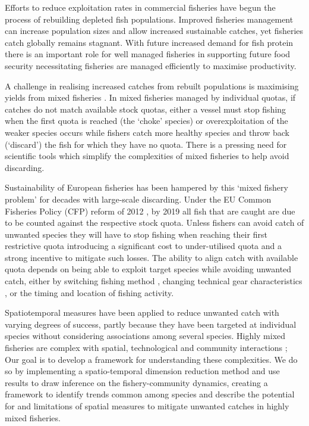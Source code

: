 \documentclass{nature}
\begin{document}
\begin{linenumbers}
 Efforts to reduce exploitation rates in commercial fisheries
have begun the process of rebuilding depleted fish populations\cite{Worm2009}.
Improved fisheries management  can increase
population sizes and allow increased sustainable catches, yet fisheries catch
globally remains stagnant\cite{FAO2016}. With future increased demand for fish
protein  there is an important role for well managed
fisheries in supporting future food security \cite{Mcclanahan2015}
  necessitating
	 fisheries are managed efficiently to
maximise productivity.

A  challenge in realising increased catches
from rebuilt populations is maximising yields from mixed fisheries
\cite{Branch2008, Kuriyama2016, Ulrich2016}. In mixed fisheries managed by individual quotas,
if catches do not match available stock quotas,
either a vessel must stop fishing when the first quota is reached (the `choke'
species) or overexploitation of the weaker species occurs while fishers
 catch more healthy species and throw back (`discard') the
fish for which they have no quota\cite{Batsleer2015}.  There is a pressing need for scientific tools which simplify the
complexities of mixed fisheries to help avoid
	discarding. 

Sustainability of European fisheries has been hampered by this `mixed fishery
problem' for decades with large-scale discarding\cite{Uhlmann2014}.   Under the EU Common Fisheries
Policy (CFP) reform of 2012 , by 2019 all fish that are caught are due to be
counted against the respective stock quota.
    Unless
fishers can avoid catch of unwanted species they will have to stop fishing when
reaching their first restrictive quota  introducing a
 significant cost to  under-utilised
quota\cite{Ulrich2016} and  a strong incentive to mitigate
such losses\cite{Condie2013}. The ability  to align
 catch with available quota depends on being able to exploit
target species while avoiding unwanted catch, either by switching fishing
method , changing technical gear
characteristics , or the
timing and location of fishing activity\cite{vanPutten2012a}. 

Spatiotemporal  measures  have been applied to reduce unwanted catch with
varying degrees of success\cite{Needle2011, Dunn2014a}, partly because
 they have  been
targeted at individual species without considering associations  among several species. Highly mixed fisheries are complex
with spatial, technological and community interactions ;
  Our goal is to develop a
framework for understanding these complexities. We do so by implementing a
spatio-temporal dimension reduction method and use  results to
draw inference on the fishery-community dynamics, creating a framework to
identify trends common among species  and describe
the potential for and limitations of spatial
measures to mitigate
unwanted catches in highly mixed fisheries.



\end{linenumbers}
\end{document}
